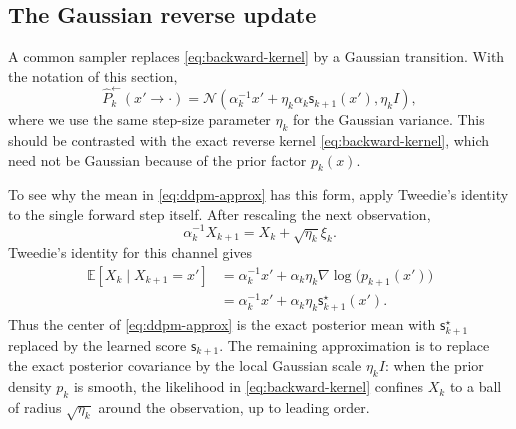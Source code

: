 \documentclass{amsart}
\numberwithin{equation}{section}
\theoremstyle{plain}
\theoremstyle{definition}
\theoremstyle{remark}
\newcommand{\E}{\mathbb{E}}
\newcommand{\Id}{I}
\newcommand{\wh}[1]{\widehat{#1}}
\newcommand{\sstar}{\mathsf{s}^{\star}}
\newcommand{\score}{\mathsf{s}}
\newcommand{\normal}[2]{\mathcal{N}\!\left(#1,#2\right)}
\begin{document}
\subsection{The Gaussian reverse update}

A common sampler replaces \eqref{eq:backward-kernel} by a Gaussian transition.
With the notation of this section,
\begin{equation}\label{eq:ddpm-approx}
    \wh P_k^{\leftarrow}(x' \to \cdot)
    =
    \normal{\alpha_k^{-1}x'+\eta_k\alpha_k\score_{k+1}(x')}
    {\eta_k\Id},
\end{equation}
where we use the same step-size parameter $\eta_k$ for the Gaussian variance.
This should be contrasted with the exact reverse kernel
\eqref{eq:backward-kernel}, which need not be Gaussian because of the prior
factor $p_k(x)$.

To see why the mean in \eqref{eq:ddpm-approx} has this form, apply Tweedie's
identity to the single forward step itself.  After rescaling the next
observation,
\[
    \alpha_k^{-1}X_{k+1}
    =
    X_k+\sqrt{\eta_k}\xi_k.
\]
Tweedie's identity for this channel gives
\[
\begin{aligned}
    \E[X_k\mid X_{k+1}=x']
    & =
    \alpha_k^{-1}x'
    +
    \alpha_k \eta_k\nabla\log\bigl( p_{k+1}(x')\bigr) \\
    & =
    \alpha_k^{-1}x'
    +
    \alpha_k \eta_k \sstar_{k+1}(x').
\end{aligned}
\]
Thus the center of \eqref{eq:ddpm-approx} is the exact posterior mean with
$\sstar_{k+1}$ replaced by the learned score $\score_{k+1}$.  The remaining
approximation is to replace the exact posterior covariance by the local Gaussian
scale $\eta_k\Id$: when the prior density $p_k$ is smooth, the likelihood in
\eqref{eq:backward-kernel} confines $X_k$ to a ball of radius
$\sqrt{\eta_k}$ around the observation, up to leading order.
\end{document}

